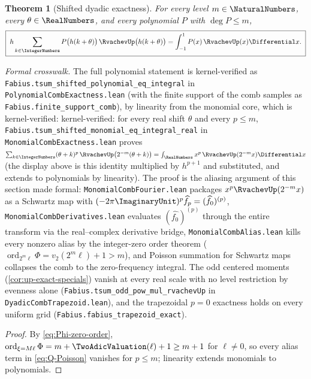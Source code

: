 \documentclass[11pt,oneside]{article}
\numberwithin{equation}{section}
\newtheorem{theorem}{Theorem}[section]
\theoremstyle{definition}
\theoremstyle{remark}
\DeclareMathOperator{\ord}{ord}
\begin{document}
\begin{theorem}[Shifted dyadic exactness]
\label{thm:shifted-exactness}
For every level $m\in\NaturalNumbers$, every $\theta\in\RealNumbers$, and every polynomial
$P$ with $\deg P\le m$,
\begin{equation}
 \boxed{\;
 h\sum_{k\in\IntegerNumbers}P\bigl(h(k+\theta)\bigr)\,
 \RvachevUp\bigl(h(k+\theta)\bigr)
 =\int_{-1}^{1}P(x)\,\RvachevUp(x)\Differential x.
 \;}
 \label{eq:polynomial-exactness}
\end{equation}
\end{theorem}

\emph{Formal crosswalk.}  The full polynomial statement is kernel-verified as
\nolinkurl{Fabius.tsum_shifted_polynomial_eq_integral} in
\nolinkurl{PolynomialCombExactness.lean} (with the finite support of the comb samples
as \nolinkurl{Fabius.finite_support_comb}), by linearity from the monomial core, which is
kernel-verified: kernel-verified: for
every real shift $\theta$ and every $p\le m$,
\nolinkurl{Fabius.tsum_shifted_monomial_eq_integral_real} in
\nolinkurl{MonomialCombExactness.lean} proves
$\sum_{k\in\IntegerNumbers}(\theta+k)^{p}\,\RvachevUp\bigl(2^{-m}(\theta+k)\bigr)=\int_\RealNumbers x^{p}\,\RvachevUp(2^{-m}x)\Differential x$
(the display above is this identity multiplied by $h^{p+1}$ and substituted, and
extends to polynomials by linearity).  The proof is the aliasing argument of this
section made formal: \nolinkurl{MonomialCombFourier.lean} packages $x^{p}\RvachevUp(2^{-m}x)$ as a
Schwartz map with $(-2\pi\ImaginaryUnit)^{p}\widehat{f_p}=(\widehat{f_0})^{(p)}$,
\nolinkurl{MonomialCombDerivatives.lean} evaluates $(\widehat{f_0})^{(p)}$ through the entire
transform via the real--complex derivative bridge, \nolinkurl{MonomialCombAlias.lean} kills
every nonzero alias by the integer-zero order theorem ($\ord_{2^{m}\ell}\Phi=v_2(2^{m}\ell)+1>m$),
and Poisson summation for Schwartz maps collapses the comb to the zero-frequency
integral.  The odd centered moments (\cref{cor:up-exact-specials}) vanish at every real
scale with no level restriction by evenness alone
(\nolinkurl{Fabius.tsum_odd_pow_mul_rvachevUp} in \nolinkurl{DyadicCombTrapezoid.lean}), and the
trapezoidal $p=0$ exactness holds on every uniform grid
(\nolinkurl{Fabius.fabius_trapezoid_exact}).

\begin{proof}
By \eqref{eq:Phi-zero-order},
$\ord_{\xi=M\ell}\Phi=m+\TwoAdicValuation(\ell)+1\ge m+1$ for $\ell\ne0$, so every
alias term in \eqref{eq:Q-Poisson} vanishes for $p\le m$; linearity
extends monomials to polynomials.
\end{proof}
\end{document}
